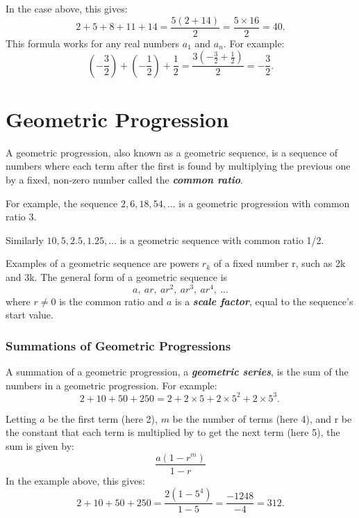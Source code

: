 \documentclass[]{report}
\begin{document}
\medskip
In the case above, this gives:
\[2+5+8+11+14={\frac  {5(2+14)}{2}}={\frac  {5\times 16}{2}}=40.\]
This formula works for any real numbers $a_{1}$ and $a_{n}$. For example:
\[\left(-{\frac  {3}{2}}\right)+\left(-{\frac  {1}{2}}\right)+{\frac  {1}{2}}={\frac  {3\left(-{\frac  {3}{2}}+{\frac  {1}{2}}\right)}{2}}=-{\frac  {3}{2}}.\]

\section{Geometric Progression}
A geometric progression, also known as a geometric sequence, is a sequence of numbers where each term after the first is found by multiplying the previous one by a fixed, non-zero number called the \textit{\textbf{common ratio}}. 

\noindent For example, the sequence $2, 6, 18, 54, \ldots$ is a geometric progression with common ratio 3. 

\noindent Similarly $10, 5, 2.5, 1.25, \ldots$ is a geometric sequence with common ratio 1/2.





\noindent Examples of a geometric sequence are powers $r_k$ of a fixed number r, such as 2k and 3k. The general form of a geometric sequence is
\[a,\ ar,\ ar^{2},\ ar^{3},\ ar^{4},\ \ldots \]
where $r \neq 0$ is the common ratio and $a$ is a \textit{\textbf{scale factor}}, equal to the sequence's start value.


\subsubsection{Summations of Geometric Progressions}
A summation of a geometric progression, a \textit{\textbf{geometric series}}, is the sum of the numbers in a geometric progression. For example:
\[2+10+50+250=2+2\times 5+2\times 5^{2}+2\times 5^{3}.\,\]

\medskip
Letting $a$ be the first term (here 2), $m$ be the number of terms (here 4), and r be the constant that each term is multiplied by to get the next term (here 5), the sum is given by:
\[{\frac  {a(1-r^{m})}{1-r}}\]
In the example above, this gives:
\[2+10+50+250={\frac  {2(1-5^{4})}{1-5}}={\frac  {-1248}{-4}}=312.\]
\end{document}
